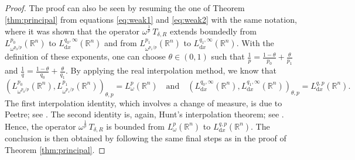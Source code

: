 \documentclass[12pt, letterpaper]{amsart}
\theoremstyle{definition}
\theoremstyle{remark}
\numberwithin{equation}{section}
\begin{document}
{\begin{proof} 
The proof can also be seen by resuming the one of Theorem \ref{thm:principal} from equations \eqref{eq:weak1} and \eqref{eq:weak2} with the same notation, where it was shown that the operator $\omega^{\frac{1}{p}} \, T_{\delta,R}$ extends boundedly from $L^{p_0}_{\omega^{p_0/p}}(\mathbb{R}^n)$ to $L^{q_0,\infty}_{\mathrm{d}x}(\mathbb{R}^n)$ and from $L^{p_1}_{\omega^{p_1/p}}(\mathbb{R}^n)$ to $L^{q_1,\infty}_{\mathrm{d}x}(\mathbb{R}^n)$. With the definition of these exponents, one can choose $\theta \in (0,1)$  such that $\frac{1}{p} = \frac{1-\theta}{p_0} + \frac{\theta}{p_1}$ and $\frac{1}{q} = \frac{1-\theta}{q_0} + \frac{\theta}{q_1}$.
    By applying the real interpolation method, we know that
    \begin{equation*}
    \left( L^{p_0}_{\omega^{p_0/p}}(\mathbb{R}^n), L^{p_1}_{\omega^{p_1/p}}(\mathbb{R}^n) \right)_{\theta, p} = L^{p}_\omega(\mathbb{R}^n) \quad \text{and} \quad
    \left( L^{q_0,\infty}_{\mathrm{d}x}(\mathbb{R}^n), L^{q_1,\infty}_{\mathrm{d}x}(\mathbb{R}^n) \right)_{\theta, p} = L^{q,p}_{\mathrm{d}x}(\mathbb{R}^n).
    \end{equation*} The first interpolation identity, which involves a change of measure, is due to Peetre; see \cite[Theorem 5.5.1]{bergh2012interpolation}. The second identity is, again, Hunt's interpolation theorem; see \cite[Theorem 5.3.1]{bergh2012interpolation}. Hence, the operator $\omega^{\frac{1}{p}} \, T_{\delta,R}$ is bounded from $L^{p}_\omega(\mathbb{R}^n)$ to $L^{q,p}_{\mathrm{d}x}(\mathbb{R}^n)$. The conclusion  is then obtained by following the same final steps as in the proof of Theorem \ref{thm:principal}.
\end{proof}





}
\end{document}
